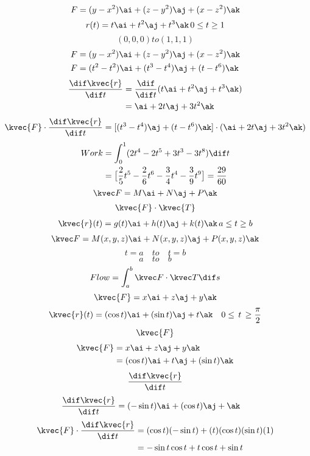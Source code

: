 \[ F=(y-x^2)\ai + (z-y^2)\aj + (x-z^2)\ak\]
\[r(t)=t\ai+t^{2}\aj+t^3 \ak \,0 \le t \ge 1 \]
\[(0,0,0) to (1,1,1)\]
\begin{align*}
F&=(y-x^2)\ai + (z-y^2)\aj + (x-z^2)\ak\\
F&=(t^{2}-t^{2})\ai + (t^{3}-t^{4})\aj +(t-t^{6})\ak
\end{align*}
\begin{align*}
\frac{\dif \kvec{r}}{\dif t}&=\frac{\dif}{\dif t}(t\ai+t^{2}\aj+t^{3}\ak)\\
&=\ai+2t\aj+3t^{2}\ak
\end{align*}
\begin{align*}
\kvec {F} \cdot \frac{\dif \kvec {r}}{\dif t} = [(t^{3}-t^{4})\aj + (t-t^{6})\ak] \cdot (\ai + 2t\aj + 3t^{2}\ak)
\end{align*}
\begin{align*}
Work &= \int_{0}^{1} (2t^{4}-2t^{5}+3t^{3}-3t^{8})\dif t\\
&=\big[\frac{2}{5}t^{5} - \frac {2}{6}t^{6} - \frac {3}{4}t^{4} - \frac{3}{9}t^{9}\big]=\frac{29}{60}
\end{align*}
\[ \kvec F=M\ai + N\aj + P\ak\]
\begin{align*}
\kvec{F} \cdot \kvec{T} 
\end{align*}
\begin{align*}
 \kvec{r}(t)= g(t)\ai + h(t)\aj +k(t)\ak \,  a\le t \ge b
\end{align*}
\begin{equation*}
\kvec F=M(x,y,z)\ai +N(x,y,z)\aj+P(x,y,z)\ak
\end{equation*}
\begin{equation*}
t=a\quad to\quad t=b
\end{equation*}
\[a\quad to \quad b \]
\begin{equation*}
Flow= \int_{a}^{b} \kvec F \cdot \kvec T \dif s
\end{equation*}
\[\kvec{F}=x\ai +z\aj +y\ak \]
\[\kvec{r}(t) = (\cos t)\ai +(\sin t)\aj +t\ak \quad 0\le\, t\, \ge \frac{\pi}{2}\]
\[\kvec{F}\]
\begin{align*}
\kvec{F}&=x\ai  +z\aj + y\ak\\
&=(\cos t)\ai + t\aj + (\sin t)\ak
\end{align*}
\[ \frac{\dif \kvec {r}}{\dif t} \]
\begin{align*}
\frac{\dif \kvec {r}}{\dif t}&=(-\sin t)\ai +(\cos t)\aj + \ak
\end{align*}
\begin{align*}
\kvec{F} \cdot \frac{\dif \kvec {r}}{\dif t}&= (\cos t)(-\sin t) +(t)(\cos t)(\sin t)(1)\\
&=-\sin t \cos t +t\cos t +\sin t
\end{align*}
